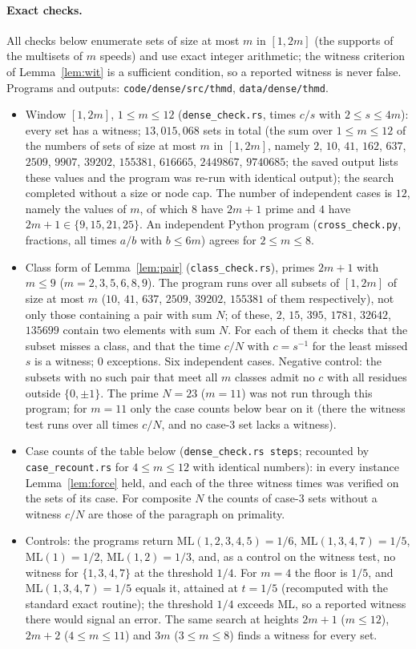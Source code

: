 \documentclass[11pt]{article}
\theoremstyle{remark}
\newcommand{\ML}{\mathrm{ML}}
\begin{document}
\paragraph{Exact checks.} All checks below enumerate sets of size at most $m$ in $[1,2m]$ (the supports of the multisets of $m$ speeds) and use exact integer arithmetic; the witness criterion of Lemma~\ref{lem:wit} is a sufficient condition, so a reported witness is never false. Programs and outputs: \texttt{code/dense/src/thmd}, \texttt{data/dense/thmd}.
\begin{itemize}
\item Window $[1,2m]$, $1\le m\le12$ (\texttt{dense\_check.rs}, times $c/s$ with $2\le s\le 4m$): every set has a witness; $13{,}015{,}068$ sets in total (the sum over $1\le m\le12$ of the numbers of sets of size at most $m$ in $[1,2m]$, namely $2$, $10$, $41$, $162$, $637$, $2509$, $9907$, $39202$, $155381$, $616665$, $2449867$, $9740685$; the saved output lists these values and the program was re-run with identical output); the search completed without a size or node cap. The number of independent cases is $12$, namely the values of $m$, of which $8$ have $2m+1$ prime and $4$ have $2m+1\in\{9,15,21,25\}$. An independent Python program (\texttt{cross\_check.py}, fractions, all times $a/b$ with $b\le6m$) agrees for $2\le m\le8$.
\item Class form of Lemma~\ref{lem:pair} (\texttt{class\_check.rs}), primes $2m+1$ with $m\le9$ ($m=2,3,5,6,8,9$). The program runs over all subsets of $[1,2m]$ of size at most $m$ ($10$, $41$, $637$, $2509$, $39202$, $155381$ of them respectively), not only those containing a pair with sum $N$; of these, $2$, $15$, $395$, $1781$, $32642$, $135699$ contain two elements with sum $N$. For each of them it checks that the subset misses a class, and that the time $c/N$ with $c=s^{-1}$ for the least missed $s$ is a witness; $0$ exceptions. Six independent cases. Negative control: the subsets with no such pair that meet all $m$ classes admit no $c$ with all residues outside $\{0,\pm1\}$. The prime $N=23$ ($m=11$) was not run through this program; for $m=11$ only the case counts below bear on it (there the witness test runs over all times $c/N$, and no case-3 set lacks a witness).
\item Case counts of the table below (\texttt{dense\_check.rs steps}; recounted by \texttt{case\_recount.rs} for $4\le m\le12$ with identical numbers): in every instance Lemma~\ref{lem:force} held, and each of the three witness times was verified on the sets of its case. For composite $N$ the counts of case-3 sets without a witness $c/N$ are those of the paragraph on primality.
\item Controls: the programs return $\ML(1,2,3,4,5)=1/6$, $\ML(1,3,4,7)=1/5$, $\ML(1)=1/2$, $\ML(1,2)=1/3$, and, as a control on the witness test, no witness for $\{1,3,4,7\}$ at the threshold $1/4$. For $m=4$ the floor is $1/5$, and $\ML(1,3,4,7)=1/5$ equals it, attained at $t=1/5$ (recomputed with the standard exact routine); the threshold $1/4$ exceeds $\ML$, so a reported witness there would signal an error. The same search at heights $2m+1$ ($m\le12$), $2m+2$ ($4\le m\le11$) and $3m$ ($3\le m\le8$) finds a witness for every set.
\end{itemize}
\end{document}

